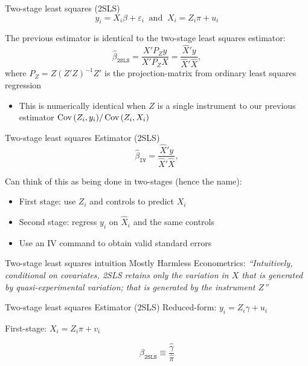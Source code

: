 \documentclass[aspectratio=169,t,11pt,table]{beamer}
\begin{document}
\begin{frame}{Two-stage least squares (2SLS)}
  \vspace{-\bigskipamount}
  $$
    y_i = X_i \beta + \varepsilon_i \ \text{ and }\  X_i = Z_i \pi  + u_i
  $$

  The previous estimator is identical to the two-stage least squares estimator:
  $$
    \hat{\beta}_{\texttt{2SLS}} = \frac{X' P_Z y}{X' P_Z X} = \frac{\hat{X}' y}{\hat{X}' \hat{X}},
  $$
  where $P_Z = Z (Z'Z)^{-1} Z'$ is the projection-matrix from ordinary least squares regression
  
  \pause
  \begin{itemize}
    \item This is numerically identical when $Z$ is a single instrument to our previous estimator $\cov{Z_i, y_i} / \cov{Z_i, X_i}$
  \end{itemize}
\end{frame}

\begin{frame}{Two-stage least squares Estimator (2SLS)}
  \vspace*{-\bigskipamount}
  $$
    \hat{\beta}_{\texttt{IV}} = \frac{\hat{X}' y}{\hat{X}' \hat{X}},
  $$

  \bigskip
  Can think of this as being done in two-stages (hence the name):
  \begin{itemize}
    \item First stage: use $Z_i$ and controls to predict $X_i$
    \item Second stage: regress $y_i$ on $\hat{X}_i$ and the same controls
    \item Use an IV command to obtain valid standard errors
  \end{itemize}
\end{frame}

\begin{frame}{Two-stage least squares intuition}
  Mostly Harmless Econometrics: \emph{``Intuitively, conditional on covariates, 2SLS retains only the variation in $X$ that is generated by quasi-experimental variation; that is generated by the instrument $Z$''}
\end{frame}

\begin{frame}{Two-stage least squares Estimator (2SLS)}
  \alert{Reduced-form:} $y_i = Z_i \gamma + u_i$

  \bigskip
  \alert{First-stage:} $X_i = Z_i \pi + v_i$

  \bigskip
  $$
    \beta_{\texttt{2SLS}} \equiv \frac{\hat{\gamma}}{\hat{\pi}}
  $$
\end{frame}
\end{document}
